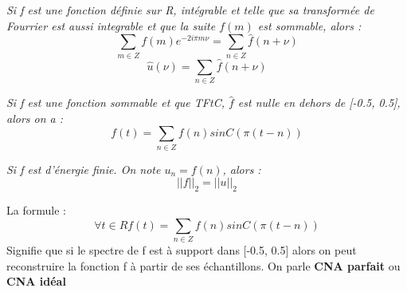 \begin{thm}
\textit{Si f est une fonction définie sur R, intégrable et telle que sa transformée de Fourrier est aussi integrable et que la suite $f(m)$ est sommable, alors : }
$$\sum_{m\in Z} f(m)e^{-2i\pi m\nu } = \sum_{n\in Z} \hat{f}(n+\nu )$$
$$\hat{u}(\nu ) = \sum_{n\in Z} \hat{f}(n+\nu )$$
\end{thm}

\begin{thm}
\textit{Si f est une fonction sommable et que TFtC, $\hat{f}$ est nulle en dehors de [-0.5, 0.5], alors on a : }
$$f(t)=\sum_{n\in Z}f(n)sinC(\pi (t-n))$$
\end{thm}

\begin{thm}
\textit{Si f est d'énergie finie. On note $u_{n}=f(n)$, alors :}
 $$||f||_{2} = ||u||_{2}$$ 
\end{thm}

\begin{defn} La formule : 
$$\forall t\in R   f(t)=\sum_{n\in Z}f(n)sinC(\pi (t-n))$$
Signifie que si le spectre de f est à support dans [-0.5, 0.5] alors on peut reconstruire la fonction f à partir de ses échantillons. On parle \textbf{CNA parfait} ou \textbf{CNA idéal}
\end{defn}

